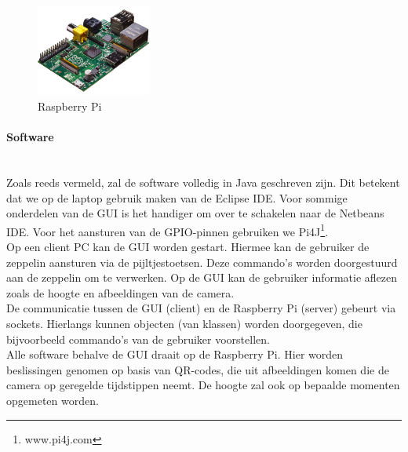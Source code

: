 \documentclass{peno-opdracht2}
\begin{document}
\begin{figure}[ht!]
\centering
\includegraphics[height=30mm]{raspb.jpg}
\caption{Raspberry Pi}
\label{Pi}
\end{figure}

\paragraph{Software} ~\\
Zoals reeds vermeld, zal de software volledig in Java geschreven zijn. Dit betekent dat we op de laptop gebruik maken van de Eclipse IDE. Voor sommige onderdelen van de GUI is het handiger om over te schakelen naar de Netbeans IDE. Voor het aansturen van de GPIO-pinnen gebruiken we Pi4J\footnote{www.pi4j.com}.\\

Op een client PC kan de GUI worden gestart. Hiermee kan de gebruiker de zeppelin aansturen via de pijltjestoetsen. Deze commando's worden doorgestuurd aan de zeppelin om te verwerken. Op de GUI kan de gebruiker informatie aflezen zoals de hoogte en afbeeldingen van de camera. \\

De communicatie tussen de GUI (client) en de Raspberry Pi (server) gebeurt via sockets. Hierlangs kunnen objecten (van klassen) worden doorgegeven, die bijvoorbeeld commando's van de gebruiker voorstellen.\\

Alle software behalve de GUI draait op de Raspberry Pi. Hier worden beslissingen genomen op basis van QR-codes, die uit afbeeldingen komen die de camera op geregelde tijdstippen neemt. De hoogte zal ook op bepaalde momenten opgemeten worden.
\end{document}
